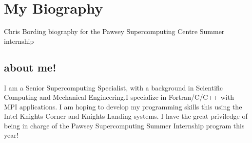 \section{My Biography}
Chris Bording biography for the Pawsey Supercomputing Centre Summer internship
\subsection{about me!}
I am a Senior Supercomputing Specialist, with a background in Scientific Computing and Mechanical Engineering.I specialize in Fortran/C/C++ with MPI applications.  I am hoping to develop my programming skills this using the Intel Knights Corner and Knights Landing systems.  I have the great priviledge of being in charge of the 
Pawsey Supercomputing Summer Internship program this year!

